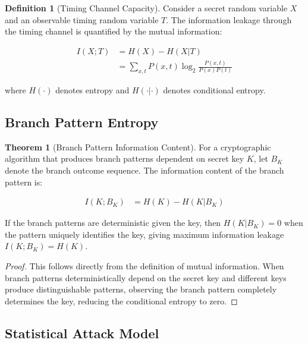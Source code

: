 \documentclass[11pt,a4paper]{article}
\theoremstyle{definition}
\newtheorem{definition}{Definition}[section]
\newtheorem{theorem}{Theorem}[section]
\begin{document}
\begin{definition}[Timing Channel Capacity]
Consider a secret random variable $X$ and an observable timing random variable $T$. The information leakage through the timing channel is quantified by the mutual information:

\begin{align}
I(X; T) &= H(X) - H(X|T) \\
&= \sum_{x,t} P(x,t) \log_2 \frac{P(x,t)}{P(x)P(t)}
\end{align}

where $H(\cdot)$ denotes entropy and $H(\cdot|\cdot)$ denotes conditional entropy.
\end{definition}

\subsection{Branch Pattern Entropy}

\begin{theorem}[Branch Pattern Information Content]
For a cryptographic algorithm that produces branch patterns dependent on secret key $K$, let $B_K$ denote the branch outcome sequence. The information content of the branch pattern is:

\begin{align}
I(K; B_K) &= H(K) - H(K|B_K)
\end{align}

If the branch patterns are deterministic given the key, then $H(K|B_K) = 0$ when the pattern uniquely identifies the key, giving maximum information leakage $I(K; B_K) = H(K)$.
\end{theorem}

\begin{proof}
This follows directly from the definition of mutual information. When branch patterns deterministically depend on the secret key and different keys produce distinguishable patterns, observing the branch pattern completely determines the key, reducing the conditional entropy to zero.
\end{proof}

\subsection{Statistical Attack Model}
\end{document}
